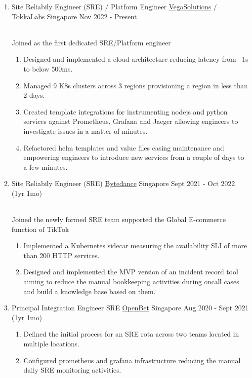 \documentclass{CVSoftwareEngineer}
\begin{document}
	\begin{enumerate}[labelwidth=!, labelindent=0pt, leftmargin=*, rightmargin=15pt]

		\item[] \cvExperience
			{Site Reliabily Engineer (SRE) / Platform Engineer}
			{\href{https://vegasolutions.co}{VegaSolutions} / \href{https://tokkalabs.com}{TokkaLabs}}
			{Singapore}
			{Nov 2022 - Present}
			{
				\\ Joined as the first dedicated SRE/Platform engineer
				\begin{enumerate}[labelwidth=!, labelindent=0pt, nosep, leftmargin=*]
					\item[\textasteriskcentered] Designed and implemented a cloud architecture reducing
						latency from ~1s to below 500ms.
					\item[\textasteriskcentered] Managed 9 K8s clusters across 3 regions provisioning a region in less than 2 days.
					\item[\textasteriskcentered] Created template integrations for instrumenting nodejs and python services
						against Prometheus, Grafana and Jaeger allowing engineers to investigate issues in a matter of minutes.
					\item[\textasteriskcentered] Refactored helm templates and value files easing maintenance and empowering
						engineers to introduce new services from a couple of days to a few minutes.
				\end{enumerate}
			}

		\item[] \cvExperience
			{Site Reliabily Engineer (SRE)}
			{\href{https://www.bytedance.com/en}{Bytedance}}
			{Singapore}
			{Sept 2021 - Oct 2022 (1yr 1mo)}
			{
				\\ Joined the newly formed SRE team supported the Global E-commerce function of TikTok
				\begin{enumerate}[labelwidth=!, labelindent=0pt, nosep, leftmargin=*]
					\item[\textasteriskcentered] Implemented a Kubernetes sidecar measuring the availability SLI of more than 200 HTTP services.
					\item[\textasteriskcentered] Designed and implemented the MVP version of an incident record tool aiming to reduce the manual bookkeeping activities during oncall cases and build a knowledge base based on them.
				\end{enumerate}
			}

		\item[] \cvExperience
			{Principal Integration Engineer \textbar SRE}
			{\href{https://www.openbet.com/}{OpenBet}}
			{Singapore}
			{Aug 2020 - Sept 2021 (1yr 1mo)}
			{\begin{enumerate}[labelwidth=!, labelindent=0pt, nosep, leftmargin=*]
					\item[\textasteriskcentered] Defined the initial process for an SRE rota across two teams located in multiple locations.
					\item[\textasteriskcentered] Configured prometheus and grafana infrastructure reducing the manual daily SRE monitoring activities.
				\end{enumerate}
			}


\end{enumerate}
\end{document}
